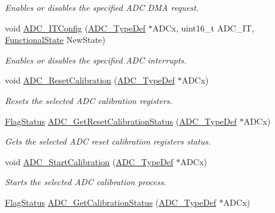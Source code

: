 \begin{DoxyCompactItemize}
\begin{DoxyCompactList}\small\item\em Enables or disables the specified A\+DC D\+MA request. \end{DoxyCompactList}\item 
void \hyperlink{group___a_d_c___private___functions_gad4c84b54b539944f555488bf979f82b6}{A\+D\+C\+\_\+\+I\+T\+Config} (\hyperlink{struct_a_d_c___type_def}{A\+D\+C\+\_\+\+Type\+Def} $\ast$A\+D\+Cx, uint16\+\_\+t A\+D\+C\+\_\+\+IT, \hyperlink{group___exported__types_gac9a7e9a35d2513ec15c3b537aaa4fba1}{Functional\+State} New\+State)
\begin{DoxyCompactList}\small\item\em Enables or disables the specified A\+DC interrupts. \end{DoxyCompactList}\item 
void \hyperlink{group___a_d_c___private___functions_ga3d542020ba28c1d16238a0defbee6d8f}{A\+D\+C\+\_\+\+Reset\+Calibration} (\hyperlink{struct_a_d_c___type_def}{A\+D\+C\+\_\+\+Type\+Def} $\ast$A\+D\+Cx)
\begin{DoxyCompactList}\small\item\em Resets the selected A\+DC calibration registers. \end{DoxyCompactList}\item 
\hyperlink{group___exported__types_ga89136caac2e14c55151f527ac02daaff}{Flag\+Status} \hyperlink{group___a_d_c___private___functions_ga113be9fe25add8d7496bed659c68e02b}{A\+D\+C\+\_\+\+Get\+Reset\+Calibration\+Status} (\hyperlink{struct_a_d_c___type_def}{A\+D\+C\+\_\+\+Type\+Def} $\ast$A\+D\+Cx)
\begin{DoxyCompactList}\small\item\em Gets the selected A\+DC reset calibration registers status. \end{DoxyCompactList}\item 
void \hyperlink{group___a_d_c___private___functions_gadcba6341124a6aabfd2dd885ca8e5f14}{A\+D\+C\+\_\+\+Start\+Calibration} (\hyperlink{struct_a_d_c___type_def}{A\+D\+C\+\_\+\+Type\+Def} $\ast$A\+D\+Cx)
\begin{DoxyCompactList}\small\item\em Starts the selected A\+DC calibration process. \end{DoxyCompactList}\item 
\hyperlink{group___exported__types_ga89136caac2e14c55151f527ac02daaff}{Flag\+Status} \hyperlink{group___a_d_c___private___functions_ga7a728f699b487c7fa1694d7424967122}{A\+D\+C\+\_\+\+Get\+Calibration\+Status} (\hyperlink{struct_a_d_c___type_def}{A\+D\+C\+\_\+\+Type\+Def} $\ast$A\+D\+Cx)

\end{DoxyCompactItemize}
